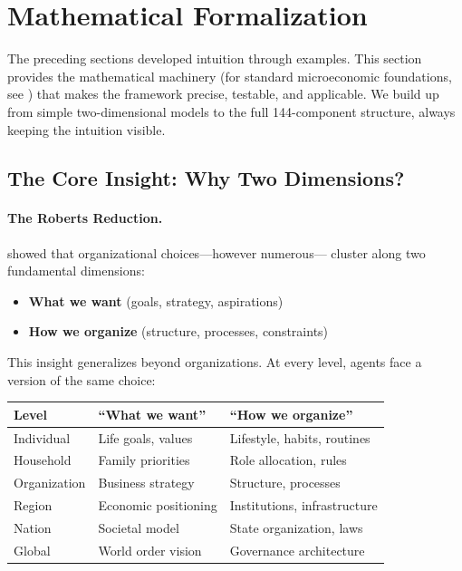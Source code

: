 \section{Mathematical Formalization}
\label{sec:mathformalization}

The preceding sections developed intuition through examples.
This section provides the mathematical machinery (for standard microeconomic foundations, see \citealt{mascolell1995}) that makes the framework precise,
testable, and applicable. We build up from simple two-dimensional models
to the full 144-component structure, always keeping the intuition visible.

\subsection{The Core Insight: Why Two Dimensions?}

\paragraph{The Roberts Reduction.}
\citet{roberts2004} showed that organizational choices---however numerous---
cluster along two fundamental dimensions:
\begin{itemize}
  \item \textbf{What we want} (goals, strategy, aspirations)
  \item \textbf{How we organize} (structure, processes, constraints)
\end{itemize}

This insight generalizes beyond organizations.
At every level, agents face a version of the same choice:
\begin{center}
\renewcommand{\arraystretch}{1.3}
\begin{tabular}{lll}
\hline
\textbf{Level} & \textbf{``What we want''} & \textbf{``How we organize''} \\
\hline
Individual & Life goals, values & Lifestyle, habits, routines \\
Household & Family priorities & Role allocation, rules \\
Organization & Business strategy & Structure, processes \\
Region & Economic positioning & Institutions, infrastructure \\
Nation & Societal model & State organization, laws \\
Global & World order vision & Governance architecture \\
\hline
\end{tabular}
\end{center}

